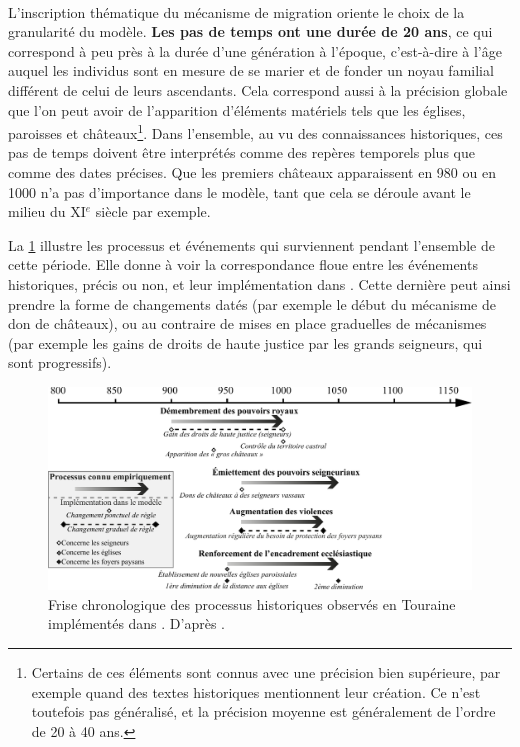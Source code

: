 \paragraph[Pas de temps de 20 ans]{} L'inscription thématique du mécanisme de migration oriente le choix de la granularité du modèle.
\textbf{Les pas de temps ont une durée de 20 ans}, ce qui correspond à peu près à la durée d'une génération à l'époque, c'est-à-dire à l'âge auquel les individus sont en mesure de se marier et de fonder un noyau familial différent de celui de leurs ascendants.
Cela correspond aussi à la précision globale que l'on peut avoir de l'apparition d'éléments matériels tels que les églises, paroisses et châteaux\footnote{
	Certains de ces éléments sont connus avec une précision bien supérieure, par exemple quand des textes historiques mentionnent leur création.
	Ce n'est toutefois pas généralisé, et la précision moyenne est généralement de l'ordre de 20 à 40 ans.
}.
Dans l'ensemble, au vu des connaissances historiques, ces pas de temps doivent être interprétés comme des repères temporels plus que comme des dates précises. 
Que les premiers châteaux apparaissent en 980 ou en 1000 n'a pas d'importance dans le modèle, tant que cela se déroule avant le milieu du XI$^e$ siècle par exemple.

La \cref{fig:frise-chrono} illustre les processus et événements qui surviennent pendant l'ensemble de cette période.
Elle donne à voir la correspondance floue entre les événements historiques, précis ou non, et leur implémentation dans \simfeodal{}.
Cette dernière peut ainsi prendre la forme de changements datés (par exemple le début du mécanisme de don de châteaux), ou au contraire de mises en place graduelles de mécanismes (par exemple les gains de droits de haute justice par les grands seigneurs, qui sont progressifs).

\begin{figure}[H]
	\centering
	\includegraphics[width=\linewidth]{img/frise_chrono_tmd.pdf}
	\caption[Frise chronologique des processus historiques observés en Touraine implémentés dans \simfeodal{}.]{Frise chronologique des processus historiques observés en Touraine implémentés dans \simfeodal{}. D'après \textcite[fig. 2, p.~315]{cura_transition_2017}.}
	\label{fig:frise-chrono}
\end{figure}



